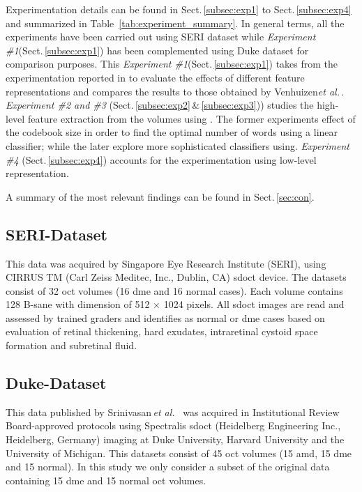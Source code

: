 Experimentation details can be found in Sect.\,\ref{subsec:exp1} to Sect.\,\ref{subsec:exp4} and summarized in Table~\ref{tab:experiment_summary}.
In general terms, all the experiments have been carried out using SERI dataset while \emph{Experiment \#1}(Sect.\,\ref{subsec:exp1}) has been complemented using Duke dataset for comparison purposes. This \emph{Experiment \#1}(Sect.\,\ref{subsec:exp1}) takes from the experimentation reported in \cite{Lemaintre2015miccaiOCT} to evaluate the effects of different feature representations and compares the results to those obtained by Venhuizen\emph{et al.}\,\cite{Venhuizen2015}.
\emph{Experiment \#2 and \#3} (Sect.\,\ref{subsec:exp2}\,\&\,\ref{subsec:exp3})) studies the high-level feature extraction from the volumes using \bow. The former experiments effect of the codebook size in order to find the optimal number of words using a linear classifier; while the later explore more sophisticated classifiers using.
\emph{Experiment \#4} (Sect.\,\ref{subsec:exp4}) accounts for the experimentation using low-level representation.

A summary of the most relevant findings can be found in Sect.\,\ref{sec:con}.





\subsection{SERI-Dataset}\label{sec:exp:dataset:seri}
This data was acquired by Singapore Eye Research Institute (SERI), using CIRRUS TM (Carl Zeiss Meditec, Inc., Dublin, CA) \ac{sdoct} device. The datasets consist of 32 \ac{oct} volumes (16 \ac{dme} and 16 normal cases). Each volume contains 128 B-sane with  dimension of 512 $\times$ 1024 pixels.  All \ac{sdoct} images are read and assessed by trained graders and identifies as normal or \ac{dme} cases based on evaluation of retinal thickening, hard exudates, intraretinal cystoid space formation and subretinal fluid.

\subsection{Duke-Dataset} \label{sec:exp:dataset:duke}
This data published by Srinivasan\,\emph{et al.}~\cite{Srinivasan2014} was acquired in Institutional Review Board-approved protocols using Spectralis \ac{sdoct} (Heidelberg Engineering Inc., Heidelberg, Germany) imaging at Duke University, Harvard University and the University of Michigan. This datasets consist of 45 \ac{oct} volumes (15 \ac{amd}, 15 \ac{dme} and 15 normal). In this study we only consider a subset of the original data containing 15 \ac{dme} and 15 normal \ac{oct} volumes.


